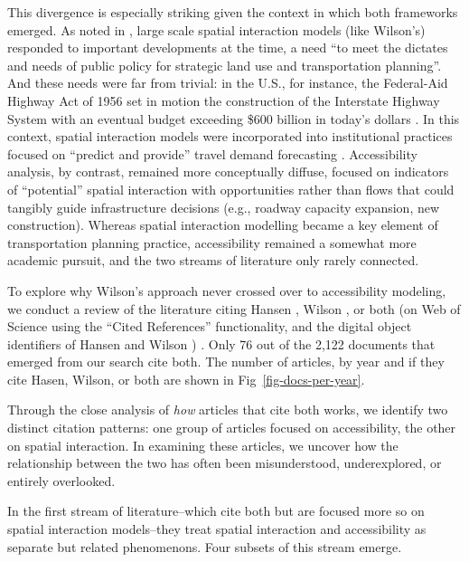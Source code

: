 \documentclass[
  10pt,
  letterpaper,
]{article}
\begin{document}
This divergence is especially striking given the context in which both
frameworks emerged. As noted in
\citet{battyChronicleScientificPlanning1994}, large scale spatial
interaction models (like Wilson's) responded to important developments
at the time, a need ``to meet the dictates and needs of public policy
for strategic land use and transportation planning''. And these needs
were far from trivial: in the U.S., for instance, the Federal-Aid
Highway Act of 1956 set in motion the construction of the Interstate
Highway System with an eventual budget exceeding \$600 billion in
today's dollars
\citep{weinerUrbanTransportationPlanning2016, mdotMnDOTJoins2007}. In
this context, spatial interaction models were incorporated into
institutional practices focused on ``predict and provide'' travel demand
forecasting
\citep{kovatch1971modeling, weinerUrbanTransportationPlanning2016}.
Accessibility analysis, by contrast, remained more conceptually diffuse,
focused on indicators of ``potential'' spatial interaction with
opportunities rather than flows that could tangibly guide infrastructure
decisions (e.g., roadway capacity expansion, new construction). Whereas
spatial interaction modelling became a key element of transportation
planning practice, accessibility remained a somewhat more academic
pursuit, and the two streams of literature only rarely connected.

To explore why Wilson's approach never crossed over to accessibility
modeling, we conduct a review of the literature citing Hansen
\citep{hansen1959}, Wilson \citep{wilson1971}, or both (on Web of
Science using the ``Cited References'' functionality, and the digital
object identifiers of Hansen \citep{hansen1959} and Wilson
\citep{wilson1971}) . Only 76 out of the 2,122 documents that emerged
from our search cite both. The number of articles, by year and if they
cite Hasen, Wilson, or both are shown in Fig~\ref{fig-docs-per-year}.

Through the close analysis of \emph{how} articles that cite both works,
we identify two distinct citation patterns: one group of articles
focused on accessibility, the other on spatial interaction. In examining
these articles, we uncover how the relationship between the two has
often been misunderstood, underexplored, or entirely overlooked.

In the first stream of literature--which cite both but are focused more
so on spatial interaction models--they treat spatial interaction and
accessibility as separate but related phenomenons. Four subsets of this
stream emerge.
\end{document}
